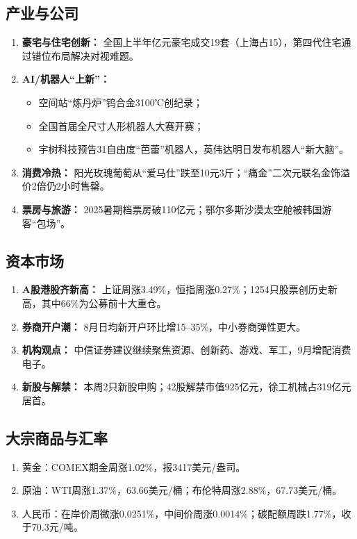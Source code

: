 \subsection{产业与公司}
\begin{enumerate}[leftmargin=*, nosep]
    \item \textbf{豪宅与住宅创新：} 全国上半年亿元豪宅成交19套（上海占15），第四代住宅通过错位布局解决对视难题。
    \item \textbf{AI/机器人“上新”：} 
        \begin{itemize}
            \item 空间站“炼丹炉”钨合金3100℃创纪录；
            \item 全国首届全尺寸人形机器人大赛开赛；
            \item 宇树科技预告31自由度“芭蕾”机器人，英伟达明日发布机器人“新大脑”。
        \end{itemize}
    \item \textbf{消费冷热：} 阳光玫瑰葡萄从“爱马仕”跌至10元3斤；“痛金”二次元联名金饰溢价2倍仍2小时售罄。
    \item \textbf{票房与旅游：} 2025暑期档票房破110亿元；鄂尔多斯沙漠太空舱被韩国游客“包场”。
\end{enumerate}

\subsection{资本市场}
\begin{enumerate}[leftmargin=*, nosep]
    \item \textbf{A股港股齐新高：} 上证周涨3.49\%，恒指周涨0.27\%；1254只股票创历史新高，其中66\%为公募前十大重仓。
    \item \textbf{券商开户潮：} 8月日均新开户环比增15–35\%，中小券商弹性更大。
    \item \textbf{机构观点：} 中信证券建议继续聚焦资源、创新药、游戏、军工，9月增配消费电子。
    \item \textbf{新股与解禁：} 本周2只新股申购；42股解禁市值925亿元，徐工机械占319亿元居首。
\end{enumerate}

\subsection{大宗商品与汇率}
\begin{enumerate}[leftmargin=*, nosep]
    \item 黄金：COMEX期金周涨1.02\%，报3417美元/盎司。
    \item 原油：WTI周涨1.37\%，63.66美元/桶；布伦特周涨2.88\%，67.73美元/桶。
    \item 人民币：在岸价周微涨0.0251\%，中间价周涨0.0014\%；碳配额周跌1.77\%，收于70.3元/吨。
\end{enumerate}



